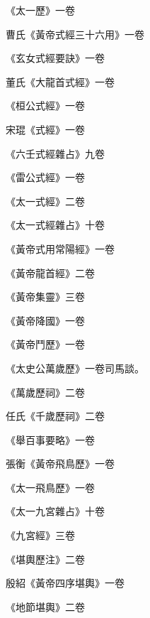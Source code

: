 \begin{pinyinscope}
 《太一歷》一卷



 曹氏《黃帝式經三十六用》一卷



 《玄女式經要訣》一卷



 董氏《大龍首式經》一卷



 《桓公式經》一卷



 宋琨《式經》一卷



 《六壬式經雜占》九卷



 《雷公式經》一卷



 《太一式經》二卷



 《太一式經雜占》十卷



 《黃帝式用常陽經》一卷



 《黃帝龍首經》二卷



 《黃帝集靈》三卷



 《黃帝降國》一卷



 《黃帝鬥歷》一卷



 《太史公萬歲歷》一卷司馬談。



 《萬歲歷祠》二卷



 任氏《千歲歷祠》二卷



 《舉百事要略》一卷



 張衡《黃帝飛鳥歷》一卷



 《太一飛鳥歷》一卷



 《太一九宮雜占》十卷



 《九宮經》三卷



 《堪輿歷注》二卷



 殷紹《黃帝四序堪輿》一卷



 《地節堪輿》二卷




\end{pinyinscope}
